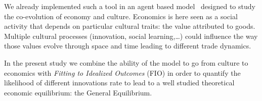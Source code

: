 \documentclass[a1paper,fontscale=.47]{baposter}
\begin{document}
\begin{poster}
{	We already implemented such a tool in an agent based model~\cite{carrignon2015modelingthecoevolutionoftradeandcultureinpastsocieties} designed to study the co-evolution of economy and culture. Economics is here seen as a social activity that depends on particular cultural traits: the value attributed to goods. Multiple cultural processes (innovation, social learning,\ldots) could influence the way those values evolve through space and time leading to different trade dynamics. 
	
	In the present study we combine the ability of the model to go from culture to economics with \emph{Fitting to Idealized Outcomes} (FIO) in order to quantify the likelihood of different innovations rate to lead to a well studied theoretical economic equilibrium: the General Equilibrium.



}

\end{poster}
\end{document}
